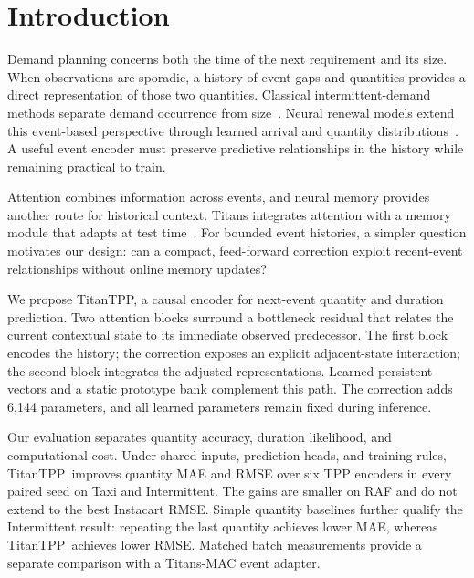\documentclass[runningheads]{llncs}
\newcommand{\method}{TitanTPP}
\begin{document}
\section{Introduction}
Demand planning concerns both the time of the next requirement and its size.
When observations are sporadic, a history of event gaps and quantities provides
a direct representation of those two quantities. Classical intermittent-demand
methods separate demand occurrence from size~\cite{croston1972forecasting}.
Neural renewal models extend this event-based perspective through learned
arrival and quantity distributions~\cite{turkmen2021renewal}. A useful event
encoder must preserve predictive relationships in the history while remaining
practical to train.

Attention combines information across events, and neural memory provides
another route for historical context. Titans integrates attention with a
memory module that adapts at test time~\cite{behrouz2025titans}. For bounded
event histories, a simpler question motivates our design: can a compact,
feed-forward correction exploit recent-event relationships without online
memory updates?

We propose \method, a causal encoder for next-event quantity and duration
prediction. Two attention blocks surround a bottleneck residual that relates
the current contextual state to its immediate observed predecessor. The first
block encodes the history; the correction exposes an explicit adjacent-state
interaction; the second block integrates the adjusted representations.
Learned persistent vectors and a static prototype bank complement this path.
The correction adds 6,144 parameters, and all learned parameters remain fixed
during inference.

Our evaluation separates quantity accuracy, duration likelihood, and
computational cost. Under shared inputs, prediction heads, and training rules,
\method\ improves quantity MAE and RMSE over six TPP encoders in every paired
seed on Taxi and Intermittent. The gains are smaller on RAF and do not extend
to the best Instacart RMSE. Simple quantity baselines further qualify the
Intermittent result: repeating the last quantity achieves lower MAE, whereas
\method\ achieves lower RMSE. Matched batch measurements provide a separate
comparison with a Titans-MAC event adapter.
\end{document}
